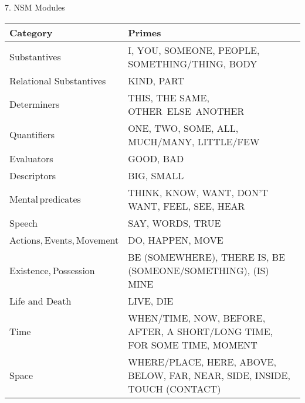 \documentclass[12pt, landscape]{article}
\begin{document}
\thispagestyle{empty}
\small
\begin{center}
{\Large 7. NSM Modules}
\begin{tabular}{|l|l|}
	\hline
\textbf{Category}& 
\textbf{Primes}\\ 
\hline

Substantives & 
	

I, YOU, SOMEONE, PEOPLE, SOMETHING/THING, BODY\\ 

Relational Substantives & 
	

KIND, PART\\ 

Determiners & 
	

THIS, THE SAME, OTHER~ELSE~ANOTHER\\ 

Quantifiers & 
	

ONE, TWO, SOME, ALL, MUCH/MANY, LITTLE/FEW\\ 

Evaluators & 
	

GOOD, BAD\\ 

Descriptors&  
	

BIG, SMALL\\ 

Mental predicates& 
	

THINK, KNOW, WANT, DON'T WANT, FEEL, SEE, HEAR\\ 

Speech& 
	

SAY, WORDS, TRUE\\ 

Actions, Events, Movement& 
	

DO, HAPPEN, MOVE\\ 

Existence, Possession& 
	

BE (SOMEWHERE), THERE IS, BE (SOMEONE/SOMETHING), (IS) MINE\\ 

Life and Death& 
	

LIVE, DIE \\

Time& 
	

WHEN/TIME, NOW, BEFORE, AFTER, A SHORT/LONG TIME, FOR SOME TIME, MOMENT\\ 

Space& 
	

WHERE/PLACE, HERE, ABOVE, BELOW, FAR, NEAR, SIDE, INSIDE, TOUCH (CONTACT)\\ 


\end{tabular}
\end{center}
\end{document}
